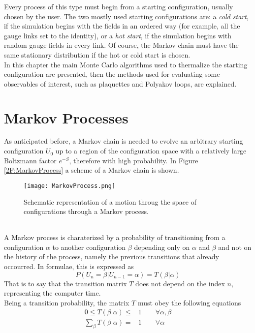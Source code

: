 Every process of this type must begin from a starting configuration, usually chosen by the user.
The two mostly used starting configurations are: a \emph{cold start}, if the simulation begins with the fields in an ordered way (for example, all the gauge links set to the identity), or a \emph{hot start}, if the simulation begins with random gauge fields in every link.
Of course, the Markov chain must have the same stationary distribution if the hot or cold start is chosen.\\
In this chapter the main Monte Carlo algorithms used to thermalize the starting configuration are presented, then the methods used for evaluating some observables of interest, such as plaquettes and Polyakov loops, are explained.

\section{Markov Processes}
As anticipated before, a Markov chain is needed to evolve an arbitrary starting configuration $U_0$ up to a region of the configuration space with a relatively large Boltzmann factor $e^{-S}$, therefore with high probability.
In Figure \eqref{2F:MarkovProcess} a scheme of a Markov chain is shown.
\begin{figure}[!htbp]
    \centering
    \texttt{[image: MarkovProcess.png]}
    \caption{Schematic representation of a motion throug the space of configurations through a Markov process.}
    \label{2F:MarkovProcess}
\end{figure}\\
A Markov process is charaterized by a probability of transitioning from a configuration $\alpha$ to another configuration $\beta$ depending only on $\alpha$ and $\beta$ and not on the history of the process, namely the previous transitions that already occourred.
In formulae, this is expressed as
\begin{equation}
    P(U_n=\beta|U_{n-1}=\alpha) = T(\beta|\alpha) \label{2:TransMatrix}
\end{equation}
That is to say that the transition matrix $T$ does not depend on the index $n$, representing the computer time.\\
Being a transition probability, the matrix $T$ must obey the following equations
\begin{align}
    0 \leq T(\beta|\alpha) \leq& 1 \qquad \forall \alpha,\beta \label{2:TPropProb} \\
    \sum_{\beta}T(\beta|\alpha) =& 1 \qquad \forall \alpha \label{2:TPropNorm}
\end{align}
